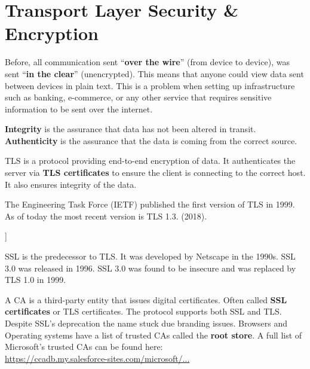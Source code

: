 \section{Transport Layer Security \& Encryption}
Before, all communication sent ``\textbf{over the wire}'' (from device to device),
was sent ``\textbf{in the clear}'' (unencrypted). This means that anyone could 
view data sent between devices in plain text. This is a problem when setting up 
infrastructure such as banking, e-commerce, or any other service that requires
sensitive information to be sent over the internet.

\begin{Def}

    \textbf{Integrity} is the assurance that data has not been altered in transit.\\
    \textbf{Authenticity} is the assurance that the data is coming from the correct source.
\end{Def}
\begin{Def}

    TLS is a protocol providing end-to-end encryption of data. It authenticates
    the server via \textbf{TLS certificates} to ensure the client is connecting to 
    the correct host. It also ensures integrity of the data.

    The Engineering Task Force (IETF) published the first version of TLS in 1999. As of 
    today the most recent version is TLS 1.3. (2018).
    \hfill \cite{cloudflare_tls}
\end{Def}

\begin{Def}[Secure Sockets Layer (SSL) [Deprecated]]

    SSL is the predecessor to TLS. It was developed by Netscape in the 1990s. 
    SSL 3.0 was released in 1996. SSL 3.0 was found to be insecure and was replaced
    by TLS 1.0 in 1999.
    \hfill \cite{cloudflare_tls}
\end{Def}

\begin{Def}

    A CA is a third-party entity that issues digital certificates. Often called \textbf{SSL certificates} or TLS certificates.
    The protocol supports both SSL and TLS. Despite SSL's deprecation the name stuck due branding issues.
    Browsers and Operating systems have a list of trusted CAs called the \textbf{root store}.
    A full list of Microsoft's trusted CAs can be found here:\\ \href{https://ccadb.my.salesforce-sites.com/microsoft/IncludedCACertificateReportForMSFT}{https://ccadb.my.salesforce-sites.com/microsoft/...}
    \hfill \cite{kinsta_tls_ssl}
\end{Def}

